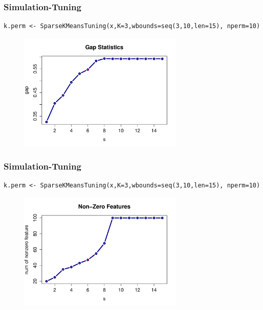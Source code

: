 \documentclass{beamer}
\begin{document}
\begin{frame}[fragile]
\frametitle{Simulation-Tuning}
\begin{lstlisting}
k.perm <- SparseKMeansTuning(x,K=3,wbounds=seq(3,10,len=15), nperm=10)
\end{lstlisting}

\begin{figure}[h!]
  \centering
    \includegraphics[width=0.7\textwidth]{gap.pdf}
\end{figure}
\end{frame}
\begin{frame}[fragile]
\frametitle{Simulation-Tuning}
\begin{lstlisting}
k.perm <- SparseKMeansTuning(x,K=3,wbounds=seq(3,10,len=15), nperm=10)
\end{lstlisting}

\begin{figure}[h!]
  \centering
    \includegraphics[width=0.7\textwidth]{nonzerofeature.pdf}
\end{figure}
\end{frame}
\end{document}
